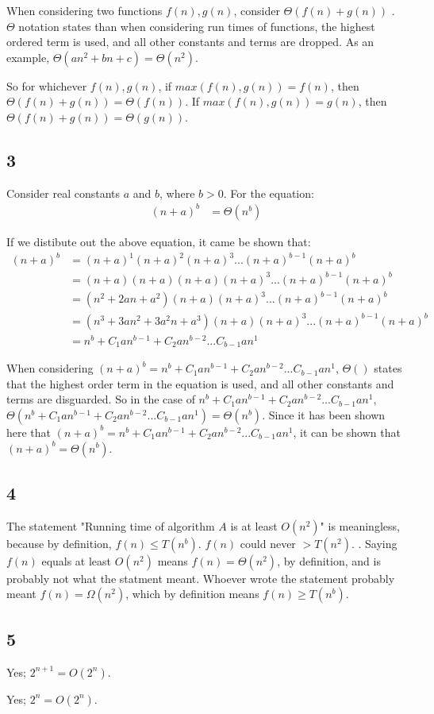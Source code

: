 \documentclass[11pt,letterpaper]{article}
\begin{document}
When considering two functions $f(n),g(n)$, consider $\Theta(f(n) + g(n))$ . $\Theta$ notation states than 
when considering run times of functions, the highest ordered term is used, and all other constants and terms
are dropped. As an example, $\Theta(an^2 + bn + c) = \Theta(n^2)$.

So for whichever $f(n), g(n)$, if $max(f(n),g(n)) = f(n)$, then $\Theta(f(n) + g(n)) = \Theta(f(n))$. If 
$max(f(n),g(n)) = g(n)$, then $\Theta(f(n) + g(n)) = \Theta(g(n))$.


\subsection*{3}
Consider real constants $a$ and $b$, where $b > 0$. For the equation:
\begin{eqnarray}
	(n+a)^b 	&	= \Theta(n^b)
\end{eqnarray}

If we distibute out the above equation, it came be shown that:
\begin{eqnarray}
	(n+a)^b 	&	= (n+a)^1(n+a)^2(n+a)^3 ... (n+a)^{b-1}(n+a)^b \\
			&	= (n+a)(n+a)(n+a)(n+a)^3 ... (n+a)^{b-1}(n+a)^b \\
			&	= (n^2 + 2an + a^2)(n+a)(n+a)^3 ... (n+a)^{b-1}(n+a)^b \\
			&	= (n^3 + 3an^2 + 3a^2n + a^3)(n+a)(n+a)^3 ... (n+a)^{b-1}(n+a)^b \\
			&	= n^b + C_1an^{b-1} + C_2an^{b-2} ... C_{b-1}an^{1}
\end{eqnarray}

When considering $(n+a)^b = n^b + C_1an^{b-1} + C_2an^{b-2} ... C_{b-1}an^{1}$, $\Theta()$ states that
the highest order term in the equation is used, and all other constants and terms are disguarded. So in the 
case of $n^b + C_1an^{b-1} + C_2an^{b-2} ... C_{b-1}an^{1}$, 
$\Theta(n^b + C_1an^{b-1} + C_2an^{b-2} ... C_{b-1}an^{1}) = \Theta(n^b)$. Since it has been shown here
that $(n+a)^b = n^b + C_1an^{b-1} + C_2an^{b-2} ... C_{b-1}an^{1}$, it can be shown that 
$(n+a)^b = \Theta(n^b)$.


\subsection*{4}
The statement "Running time of algorithm $A$ is at least $O(n^2)$" is meaningless, because by definition,
$f(n) \leq T(n^b)$. $f(n)$ could never $> T(n^2).$ . Saying $f(n)$ equals at least $O(n^2)$ means $f(n) = \Theta(n^2)$, by definition, and is probably not what the statment meant. Whoever wrote the statement
probably meant $f(n) = \Omega(n^2)$, which by definition means $f(n) \geq T(n^b)$.


\subsection*{5}
Yes; $2^{n+1} = O(2^n)$.

Yes; $2^n = O(2^n)$. 
\end{document}
